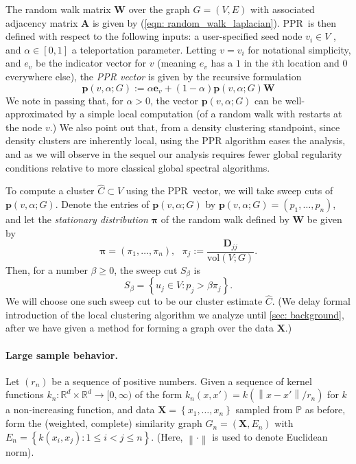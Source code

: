 \documentclass{article}
\newcommand{\set}[1]{\left\{#1\right\}}
\newcommand{\vol}{\mathrm{vol}}
\newcommand{\Reals}{\mathbb{R}}
\newcommand{\Rd}{\Reals^d}
\newcommand{\norm}[1]{\left\lVert#1\right\rVert}
\newcommand{\1}{\mathbf{1}}
\newcommand{\pbf}{\mathbf{p}}
\newcommand{\ebf}[1]{\mathbf{e}_{#1}}
\newcommand{\pibf}{\bm{\pi}}
\newcommand{\Abf}{\mathbf{A}}
\newcommand{\Xbf}{\mathbf{X}}
\newcommand{\Wbf}{\mathbf{W}}
\newcommand{\Dbf}{\mathbf{D}}
\newcommand{\Pbb}{\mathbb{P}}
\newcommand{\pprspace}{{\sc PPR~}}
\theoremstyle{aldenthm}
\theoremstyle{remark}
\begin{document}
The random walk matrix $\Wbf$ over the graph $G = (V,E)$ with associated adjacency matrix $\Abf$ is given by (\ref{eqn: random_walk_laplacian}). \pprspace is then defined with respect to the following inputs: a user-specified seed node $v_i \in V$ , and  $\alpha \in [0,1]$ a teleportation parameter. Letting $v = v_i$ for notational simplicity, and $e_{v}$ be the indicator vector for $v$ (meaning $e_v$ has a $1$ in the $i$th location and $0$ everywhere else), the \emph{PPR vector} is given by the recursive formulation
\begin{equation}
\label{eqn: ppr_vector}
\pbf(v,\alpha;G) := \alpha \ebf{v} + (1 - \alpha) \pbf(v,\alpha;G) \Wbf
\end{equation}
We note in passing that, for $\alpha > 0$, the vector $\pbf(v,\alpha;G)$ can be well-approximated by a simple local computation (of a random walk with restarts at the node $v$.) We also point out that, from a density clustering standpoint, since density clusters are inherently local, using the PPR algorithm eases the analysis, and as we will observe in the sequel our analysis requires fewer global regularity conditions relative to more classical global spectral algorithms. 

To compute a cluster $\widehat{C} \subset V$ using the \pprspace vector, we will take sweep cuts of $\pbf(v, \alpha; G)$. Denote the entries of $\pbf(v, \alpha; G)$ by $\pbf(v, \alpha; G) = (p_1, \ldots, p_n)$, and let the \emph{stationary distribution} $\pibf$ of the random walk defined by $\Wbf$ be given by
\begin{equation*}
\pibf = (\pi_1, \ldots, \pi_n), ~~~ \pi_j := \frac{\Dbf_{jj}}{\vol(V; G)}.
\end{equation*}
Then, for a number $\beta \geq 0$, the sweep cut $S_\beta$ is
\begin{equation}
\label{eqn: sweep_cuts}
S_\beta = \set{u_j \in V: p_j > \beta \pi_j}.
\end{equation}
We will choose one such sweep cut to be our cluster estimate $\widehat{C}$.  
(We delay formal introduction of the local clustering algorithm we analyze until \ref{sec: background}, after we have given a method for forming a graph over the data $\Xbf$.)

\paragraph{Large sample behavior.}

Let $(r_n)$ be a sequence of positive numbers. Given a sequence of kernel functions $k_n: \Rd \times \Rd \to [0,\infty)$ of the form $k_n(x,x') = k(\norm{x - x'}/ r_n)$ for $k$ a non-increasing function, and data $\Xbf = \set{x_1, \ldots, x_n}$ sampled from $\Pbb$ as before, form the (weighted, complete) similarity graph $G_n = (\Xbf, E_n)$ with $E_n = \set{k(x_i,x_j): 1 \leq i < j \leq n}$. (Here, $\norm{\cdot}$ is used to denote Euclidean norm). 
\end{document}
